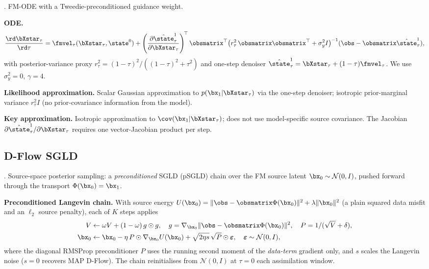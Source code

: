\cite{pokle_training-free_2024}. FM-ODE with a Tweedie-preconditioned guidance weight.

\textbf{ODE.}
\begin{align}
  \frac{\rd\bXstar_\tau}{\rd\tau}
  = \fmvel_\tau(\bXstar_\tau,\state^0)
  + \left(\frac{\partial\hat{\state}^1_\tau}{\partial\bXstar_\tau}\right)^{\!\top}
    \obsmatrix^\top
    \bigl(r_\tau^2\,\obsmatrix\obsmatrix^\top + \sigma_y^2 I\bigr)^{-1}
    (\obs - \obsmatrix\hat{\state}^1_\tau),
\end{align}
with posterior-variance proxy $r_\tau^2 = (1-\tau)^2/((1-\tau)^2+\tau^2)$ and
one-step denoiser $\hat{\state}^1_\tau = \bXstar_\tau + (1-\tau)\fmvel_\tau$. We use $\sigma_y^2=0$, $\gamma=4$.

\textbf{Likelihood approximation.}
Scalar Gaussian approximation to $p(\bx_1|\bXstar_\tau)$ via the one-step denoiser; isotropic prior-marginal variance $r_\tau^2 I$ (no prior-covariance information from the model).

\textbf{Key approximation.}
Isotropic approximation to $\cov(\bx_1|\bXstar_\tau)$; does not use model-specific source covariance.
The Jacobian $\partial\hat{\state}^1_\tau/\partial\bXstar_\tau$ requires one vector-Jacobian product per step.

\subsection{D-Flow SGLD}\label{appendix:method:dflow}

\cite{parikh_d-flow_2026,ben-hamu_d-flow_2024}. Source-space posterior sampling: a \emph{preconditioned} SGLD (pSGLD) chain over the FM source latent $\bx_0\sim\mathcal{N}(0,I)$, pushed forward through the transport $\Phi(\bx_0)=\bx_1$.

\textbf{Preconditioned Langevin chain.}
With source energy $U(\bx_0)=\|\obs-\obsmatrix\Phi(\bx_0)\|^2+\lambda\|\bx_0\|^2$ (a plain squared data misfit and an $\ell_2$ source penalty), each of $K$ steps applies
\begin{align}
  V &\leftarrow \omega V+(1-\omega)\,g\odot g,\quad g=\nabla_{\bx_0}\|\obs-\obsmatrix\Phi(\bx_0)\|^2,\quad P=1/(\sqrt{V}+\delta),\\
  \bx_0 &\leftarrow \bx_0-\eta\,P\odot\nabla_{\bx_0}U(\bx_0)+\sqrt{2\eta s}\,\sqrt{P}\odot\boldsymbol\varepsilon,\quad \boldsymbol\varepsilon\sim\mathcal{N}(0,I),
\end{align}
where the diagonal RMSProp preconditioner $P$ uses the running second moment of the \emph{data-term} gradient only, and $s$ scales the Langevin noise ($s{=}0$ recovers MAP D-Flow). The chain reinitialises from $\mathcal{N}(0,I)$ at $\tau=0$ each assimilation window.

